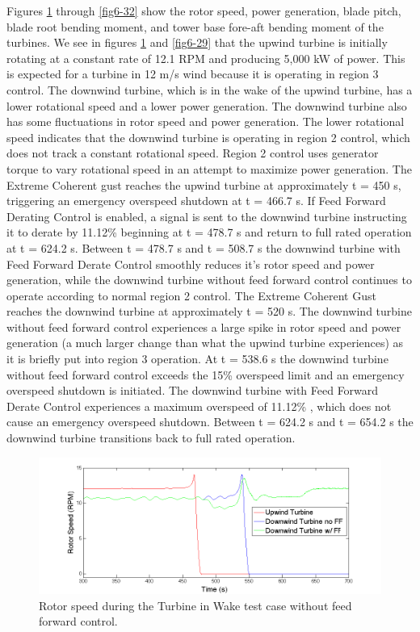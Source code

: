  Figures \ref{fig6-28} through \ref{fig6-32} show the rotor speed, power generation, blade pitch, blade root bending moment, and tower base fore-aft bending moment of the turbines. We see in figures \ref{fig6-28} and \ref{fig6-29} that the upwind turbine is initially rotating at a constant rate of 12.1 RPM and producing 5,000 kW of power. This is expected for a turbine in 12 m/s wind because it is operating in region 3 control. The downwind turbine, which is in the wake of the upwind turbine,  has a lower rotational speed and a lower power generation. The downwind turbine also has some fluctuations in rotor speed and power generation. The lower rotational speed indicates that the downwind turbine is operating in region 2 control, which does not track a constant rotational speed. Region 2 control uses generator torque to vary rotational speed in an attempt to maximize power generation. The Extreme Coherent gust reaches the upwind turbine at approximately t = 450 s, triggering an emergency overspeed shutdown at t = 466.7 s. If Feed Forward Derating Control is enabled, a signal is sent to the downwind turbine instructing it to derate by 11.12\% beginning at t = 478.7 s and return to full rated operation at t = 624.2 s. Between t = 478.7 s and t = 508.7 s the downwind turbine with Feed Forward Derate Control smoothly reduces it's rotor speed and power generation, while the downwind turbine without feed forward control continues to operate according to normal region 2 control. The Extreme Coherent Gust reaches the downwind turbine at approximately t = 520 s. The downwind turbine without feed forward control experiences a large spike in rotor speed and power generation (a much larger change than what the upwind turbine experiences) as it is briefly put into region 3 operation. At t = 538.6 s the downwind turbine without feed forward control exceeds the 15\% overspeed limit and an emergency overspeed shutdown is initiated. The downwind turbine with Feed Forward Derate Control experiences a maximum overspeed of 11.12\% , which does not cause an emergency overspeed shutdown. Between t = 624.2 s and t = 654.2 s the downwind turbine transitions back to full rated operation.

\begin{figure}[!htbp] 
	\centering
		\includegraphics[width = \linewidth]{Figures/ch6Figures/fig6-28.png}
	\caption{Rotor speed during the Turbine in Wake test case without feed forward control.}
	\label{fig6-28}
\end{figure}

